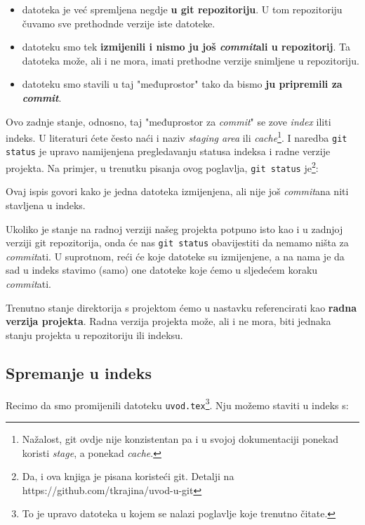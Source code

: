 \begin{itemize}
	\item datoteka je već spremljena negdje \textbf{u git repozitoriju}. U tom repozitoriju čuvamo sve prethodnde verzije iste datoteke.
	\item datoteku smo tek \textbf{izmijenili i nismo ju još \emph{commit}ali u repozitorij}. Ta datoteka može, ali i ne mora, imati prethodne verzije snimljene u repozitoriju.
	\item datoteku smo stavili u taj "međuprostor" tako da bismo \textbf{ju pripremili za \emph{commit}}.
\end{itemize}

Ovo zadnje stanje, odnosno, taj "međuprostor za \emph{commit}" se zove \emph{index} iliti indeks.
U literaturi ćete često naći i naziv \emph{staging area} ili \emph{cache}\footnote{Nažalost, git ovdje nije konzistentan pa i u svojoj dokumentaciji ponekad koristi \emph{stage}, a ponekad \emph{cache}.}.
I naredba \verb+git status+ je upravo namijenjena pregledavanju statusa indeksa i radne verzije projekta.
Na primjer, u trenutku pisanja ovog poglavlja, \verb+git status+ je\footnote{Da, i ova knjiga je pisana koristeći git. Detalji na https://github.com/tkrajina/uvod-u-git}:



Ovaj ispis govori kako je jedna datoteka izmijenjena, ali nije još \emph{commit}ana niti stavljena u indeks.

Ukoliko je stanje na radnoj verziji našeg projekta potpuno isto kao i u zadnjoj verziji git repozitorija, onda će nas \verb+git status+ obavijestiti da nemamo ništa za \emph{commit}ati.
U suprotnom, reći će koje datoteke su izmijenjene, a na nama je da sad u indeks stavimo (samo) one datoteke koje ćemo u sljedećem koraku \emph{commit}ati.

Trenutno stanje direktorija s projektom ćemo u nastavku referencirati kao \textbf{radna verzija projekta}.
Radna verzija projekta može, ali i ne mora, biti jednaka stanju projekta u repozitoriju ili indeksu.

\subsection*{Spremanje u indeks}

Recimo da smo promijenili datoteku \verb+uvod.tex+\footnote{To je upravo datoteka u kojem se nalazi poglavlje koje trenutno čitate.}.
Nju možemo staviti u indeks s:

